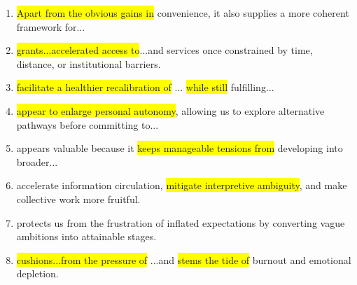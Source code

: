 ﻿\documentclass[lang=cn,11pt]{elegantbook}
\begin{document}
\begin{enumerate}
    \item \colorbox{yellow}{Apart from the obvious gains in} convenience, it also supplies a more coherent framework for...
    \item \colorbox{yellow}{grants...accelerated access to}...and services once constrained by time, distance, or institutional barriers.
    \item \colorbox{yellow}{facilitate a healthier recalibration of} ... \colorbox{yellow}{while still} fulfilling...
    \item \colorbox{yellow}{appear to enlarge personal autonomy}, allowing us to explore alternative pathways before committing to...
    \item appears valuable because it \colorbox{yellow}{keeps manageable tensions from} developing into broader...
    \item accelerate information circulation, \colorbox{yellow}{mitigate interpretive ambiguity}, and make collective work more fruitful.
    \item protects us from the frustration of inflated expectations by converting vague ambitions into attainable stages.
    \item \colorbox{yellow}{cushions...from the pressure of} ...and \colorbox{yellow}{stems the tide of} burnout and emotional depletion.
\end{enumerate}
\end{document}
